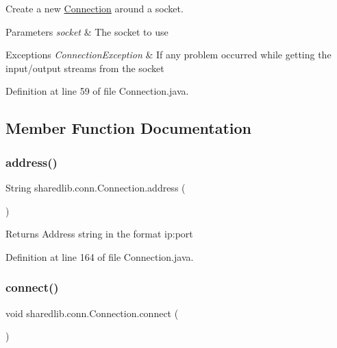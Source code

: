 Create a new \hyperlink{classsharedlib_1_1conn_1_1_connection}{Connection} around a socket. 
\begin{DoxyParams}{Parameters}
{\em socket} & The socket to use \\
\hline
\end{DoxyParams}

\begin{DoxyExceptions}{Exceptions}
{\em Connection\+Exception} & If any problem occurred while getting the input/output streams from the socket \\
\hline
\end{DoxyExceptions}


Definition at line 59 of file Connection.\+java.



\subsection{Member Function Documentation}
\hypertarget{classsharedlib_1_1conn_1_1_connection_a1f831c20f53c52311f0350ea8a366fe7}{}\label{classsharedlib_1_1conn_1_1_connection_a1f831c20f53c52311f0350ea8a366fe7} 
\subsubsection{\texorpdfstring{address()}{address()}}
{\footnotesize\ttfamily String sharedlib.\+conn.\+Connection.\+address (\begin{DoxyParamCaption}{ }\end{DoxyParamCaption})}

\begin{DoxyReturn}{Returns}
Address string in the format ip\+:port 
\end{DoxyReturn}


Definition at line 164 of file Connection.\+java.

\hypertarget{classsharedlib_1_1conn_1_1_connection_a9a8ee0f703a3c867d5630edb02779847}{}\label{classsharedlib_1_1conn_1_1_connection_a9a8ee0f703a3c867d5630edb02779847} 
\subsubsection{\texorpdfstring{connect()}{connect()}}
{\footnotesize\ttfamily void sharedlib.\+conn.\+Connection.\+connect (\begin{DoxyParamCaption}{ }\end{DoxyParamCaption})}

